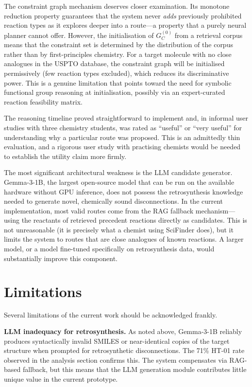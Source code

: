 \documentclass[12pt,a4paper]{article}
\begin{document}
The constraint graph mechanism deserves closer examination. Its monotone
reduction property guarantees that the system never \emph{adds} previously
prohibited reaction types as it explores deeper into a route—a property that
a purely neural planner cannot offer. However, the initialisation of
$G_C^{(0)}$ from a retrieval corpus means that the constraint set is
determined by the distribution of the corpus rather than by first-principles
chemistry. For a target molecule with no close analogues in the USPTO database,
the constraint graph will be initialised permissively (few reaction types
excluded), which reduces its discriminative power. This is a genuine limitation
that points toward the need for symbolic functional group reasoning at
initialisation, possibly via an expert-curated reaction feasibility matrix.

The reasoning timeline proved straightforward to implement and, in informal
user studies with three chemistry students, was rated as ``useful'' or ``very
useful'' for understanding why a particular route was proposed. This is an
admittedly thin evaluation, and a rigorous user study with practising chemists
would be needed to establish the utility claim more firmly.

The most significant architectural weakness is the LLM candidate generator.
Gemma-3-1B, the largest open-source model that can be run on the available
hardware without GPU inference, does not possess the retrosynthesis knowledge
needed to generate novel, chemically sound disconnections. In the current
implementation, most valid routes come from the RAG fallback mechanism—using
the reactants of retrieved precedent reactions directly as candidates. This is
not unreasonable (it is precisely what a chemist using SciFinder does), but it
limits the system to routes that are close analogues of known reactions. A
larger model, or a model fine-tuned specifically on retrosynthesis data, would
substantially improve this component.

\section{Limitations}

Several limitations of the current work should be acknowledged frankly.

\textbf{LLM inadequacy for retrosynthesis.} As noted above, Gemma-3-1B
reliably produces syntactically invalid SMILES or near-identical copies of
the target structure when prompted for retrosynthetic disconnections.
The 71\% HT-01 rate observed in the analysis section confirms this. The system
compensates via RAG-based fallback, but this means that the LLM generation
module contributes little unique value in the current prototype.
\end{document}
